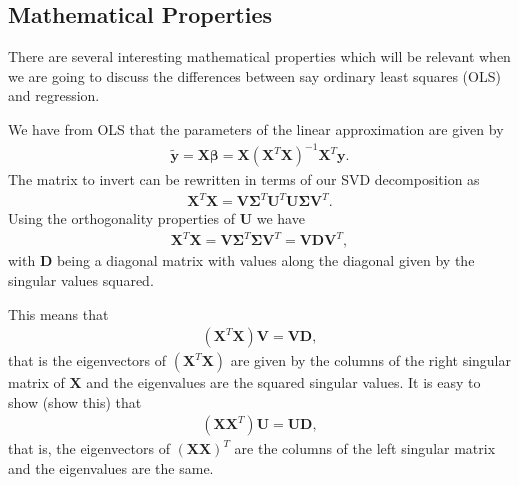 \documentclass[letterpaper,10pt,english]{sphinxmanual}
\begin{document}
\subsection{Mathematical Properties}
\label{\detokenize{chapter4:mathematical-properties}}
There are several interesting mathematical properties which will be
relevant when we are going to discuss the differences between say
ordinary least squares (OLS) and  regression.

We have from OLS that the parameters of the linear approximation are given by
\begin{equation*}
\begin{split}
\boldsymbol{\tilde{y}} = \boldsymbol{X}\boldsymbol{\beta} = \boldsymbol{X}\left(\boldsymbol{X}^T\boldsymbol{X}\right)^{-1}\boldsymbol{X}^T\boldsymbol{y}.
\end{split}
\end{equation*}
The matrix to invert can be rewritten in terms of our SVD decomposition as
\begin{equation*}
\begin{split}
\boldsymbol{X}^T\boldsymbol{X} = \boldsymbol{V}\boldsymbol{\Sigma}^T\boldsymbol{U}^T\boldsymbol{U}\boldsymbol{\Sigma}\boldsymbol{V}^T.
\end{split}
\end{equation*}
Using the orthogonality properties of \(\boldsymbol{U}\) we have
\begin{equation*}
\begin{split}
\boldsymbol{X}^T\boldsymbol{X} = \boldsymbol{V}\boldsymbol{\Sigma}^T\boldsymbol{\Sigma}\boldsymbol{V}^T =  \boldsymbol{V}\boldsymbol{D}\boldsymbol{V}^T,
\end{split}
\end{equation*}
with \(\boldsymbol{D}\) being a diagonal matrix with values along the diagonal given by the singular values squared.

This means that
\begin{equation*}
\begin{split}
(\boldsymbol{X}^T\boldsymbol{X})\boldsymbol{V} = \boldsymbol{V}\boldsymbol{D},
\end{split}
\end{equation*}
that is the eigenvectors of \((\boldsymbol{X}^T\boldsymbol{X})\) are given by the columns of the right singular matrix of \(\boldsymbol{X}\) and the eigenvalues are the squared singular values.  It is easy to show (show this) that
\begin{equation*}
\begin{split}
(\boldsymbol{X}\boldsymbol{X}^T)\boldsymbol{U} = \boldsymbol{U}\boldsymbol{D},
\end{split}
\end{equation*}
that is, the eigenvectors of \((\boldsymbol{X}\boldsymbol{X})^T\) are the columns of the left singular matrix and the eigenvalues are the same.
\end{document}
